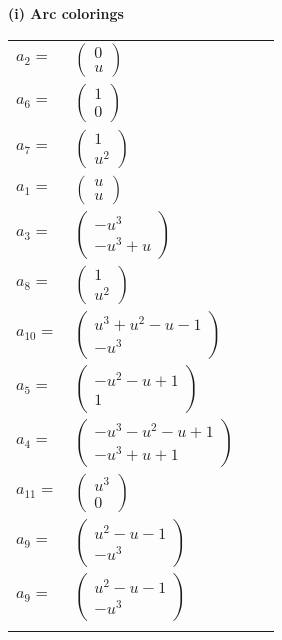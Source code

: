 \documentclass[1p]{elsarticle_modified}
\theoremstyle{definition}
\begin{document}
\flushleft \textbf{(i) Arc colorings}\\
\begin{tabular}{m{7pt} m{180pt} m{7pt} m{180pt} }
\flushright $a_{2}=$&$\begin{pmatrix}0\\u\end{pmatrix}$ \\
\flushright $a_{6}=$&$\begin{pmatrix}1\\0\end{pmatrix}$ \\
\flushright $a_{7}=$&$\begin{pmatrix}1\\u^2\end{pmatrix}$ \\
\flushright $a_{1}=$&$\begin{pmatrix}u\\u\end{pmatrix}$ \\
\flushright $a_{3}=$&$\begin{pmatrix}- u^3\\- u^3+u\end{pmatrix}$ \\
\flushright $a_{8}=$&$\begin{pmatrix}1\\u^2\end{pmatrix}$ \\
\flushright $a_{10}=$&$\begin{pmatrix}u^3+u^2- u-1\\- u^3\end{pmatrix}$ \\
\flushright $a_{5}=$&$\begin{pmatrix}- u^2- u+1\\1\end{pmatrix}$ \\
\flushright $a_{4}=$&$\begin{pmatrix}- u^3- u^2- u+1\\- u^3+u+1\end{pmatrix}$ \\
\flushright $a_{11}=$&$\begin{pmatrix}u^3\\0\end{pmatrix}$ \\
\flushright $a_{9}=$&$\begin{pmatrix}u^2- u-1\\- u^3\end{pmatrix}$\\ \flushright $a_{9}=$&$\begin{pmatrix}u^2- u-1\\- u^3\end{pmatrix}$\\&\end{tabular}
\end{document}
